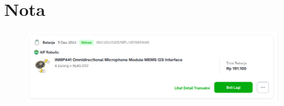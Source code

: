 \documentclass[12pt,]{article}
\begin{document}
	\newpage
	\section{Nota}
	
	\centering
	\begin{figure}[!ht]
		\centering
		\includegraphics[width=\textwidth,]{images/mic_mems_i2s.png}
	\end{figure}

	
\end{document}
